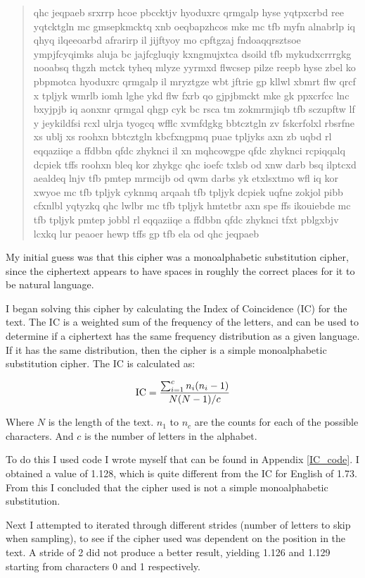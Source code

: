 \documentclass[11pt,a4paper,twoside]{article}
\begin{document}
\begin{quote}
\small
\raggedright
qhc jeqpaeb srxrrp hcoe pbccktjv hyoduxrc qrmgalp hyse yqtpxcrbd ree yqtcktgln
mc gmsepkmcktq xnb oeqbapzhcos mke mc tfb myfn alnabrlp iq qhyq ilqeeoarbd
afrarirp il jijftyoy mo cpftgzaj fndoaqqrsztsoe ympjfcyqimks aluja bc
jajfcgluqiy kxngmujxtca dsoild tfb mykudxcrrrgkg nooabsq thgzh mctck tyheq
mlyze yyrmxd flwcsep pilze reepb hyse zbel ko pbpmotca hyoduxrc qrmgalp il
mryztgze wbt jftrie gp kllwl xbmrt flw qrcf x tpljyk wmrlb iomh lghe ykd flw
fxrb qo gjpjbmckt mke gk ppxcrfcc lnc bxyjpjb iq aonxnr qrmgal qhgp cyk bc rsca
tm zokmrmjiqb tfb sczupftw lf y jeykildfsi rcxl ulrja tyogcq wfflc xvmfdgkg
bbtcztgln zv fskcrfolxl rbsrfne xs ublj xs roohxn bbtcztgln kbcfxngpmq puae
tpljyks axn zb uqbd rl eqqaziiqe a ffdbbn qfdc zhyknci il xn mqhcowgpe qfdc
zhyknci rcpiqqalq dcpiek tffs roohxn bleq kor zhykgc qhc ioefc txlsb od xnw
darb bsq ilptcxd aealdeq lnjv tfb pmtep mrmcijb od qwm darbs yk etxlsxtmo wfl
iq kor xwyoe mc tfb tpljyk cyknmq arqaah tfb tpljyk dcpiek uqfne zokjol pibb
cfxnlbl yqtyzkq qhc lwlbr mc tfb tpljyk hmtetbr axn spe ffs ikouiebde mc tfb
tpljyk pmtep jobbl rl eqqaziiqe a ffdbbn qfdc zhyknci tfxt pblgxbjv lcxkq lur
peaoer hewp tffs gp tfb ela od qhc jeqpaeb 
\end{quote}

My initial guess was that this cipher was a monoalphabetic substitution cipher,
since the ciphertext appears to have spaces in roughly the correct places for
it to be natural language. 

I began solving this cipher by calculating the Index of Coincidence (IC) for
the text. The IC is a weighted sum of the frequency of the letters, and can be
used to determine if a ciphertext has the same frequency distribution as a given
language. If it has the same distribution, then the cipher is a simple
monoalphabetic substitution cipher. The IC is calculated as:

$$
\textup{IC} =  \frac{\sum_{i=1}^{c} n_i(n_i -1)}{N(N - 1)/c}
$$

Where $N$ is the length of the text. $n_1$ to $n_c$ are the counts
for each of the possible characters. And $c$ is the number of
letters in the alphabet. 

To do this I used code I wrote myself that can be found in Appendix
\ref{IC_code}. I obtained a value of 1.128, which is quite different from the
IC for English of 1.73. From this I concluded that the cipher used is not a
simple monoalphabetic substitution. 

Next I attempted to iterated through different strides (number of letters to
skip when sampling), to see if the cipher used was dependent on the position in
the text. A stride of 2 did not produce a better result, yielding 1.126 and
1.129 starting from characters 0 and 1 respectively.  
\end{document}
